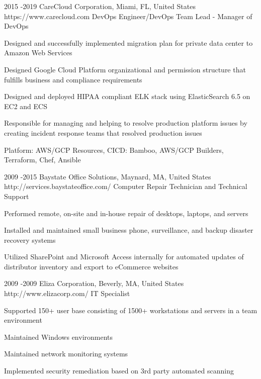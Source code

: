 \documentclass[10pt]{article} %
\begin{document}
\job
{2015 -}{2019}
{CareCloud Corporation, Miami, FL, United States}
{https://www.carecloud.com}
{DevOps Engineer/DevOps Team Lead - Manager of DevOps}
{\begin{itemize-noindent}
\item{Designed and successfully implemented migration plan for private data center to Amazon Web Services}
\item{Designed Google Cloud Platform organizational and permission structure that fulfills business and compliance requirements}
\item{Designed and deployed HIPAA compliant ELK stack using ElasticSearch 6.5 on EC2 and ECS}
\item{Responsible for managing and helping to resolve production platform issues by creating incident response teams that resolved production issues}
\item{Platform: AWS/GCP Resources, CICD: Bamboo, AWS/GCP Builders, Terraform, Chef, Ansible}
\end{itemize-noindent}}
\newpage
\job
{2009 -}{2015}
{Baystate Office Solutions, Maynard, MA, United States}
{http://services.baystateoffice.com/}
{Computer Repair Technician and Technical Support}
{\begin{itemize-noindent}
\item{Performed remote, on-site and in-house repair of desktops, laptops, and servers}
\item{Installed and maintained small business phone, surveillance, and backup disaster recovery systems}
\item{Utilized SharePoint and Microsoft Access internally for automated updates of distributor inventory and export to eCommerce websites}
\end{itemize-noindent}}
\job
{2009 -}{2009}
{Eliza Corporation, Beverly, MA, United States}
{http://www.elizacorp.com/}
{IT Specialist}
{\begin{itemize-noindent}
\item{Supported 150+ user base consisting of 1500+ workstations and servers in a team environment}
\item{Maintained Windows environments}
\item{Maintained network monitoring systems}
\item{Implemented security remediation based on 3rd party automated scanning}
\end{itemize-noindent}}
\end{document}
